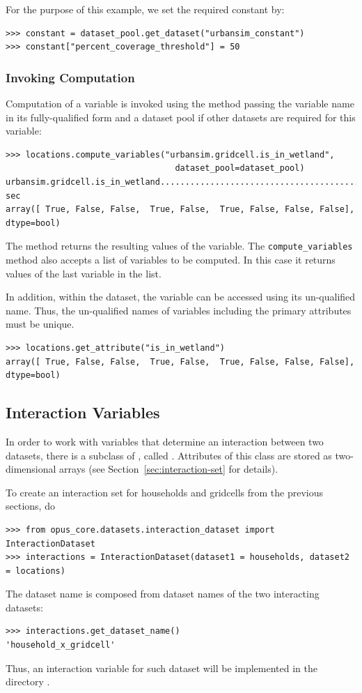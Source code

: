 For the purpose of this example, we set the required constant by:
\begin{verbatim}
>>> constant = dataset_pool.get_dataset("urbansim_constant")
>>> constant["percent_coverage_threshold"] = 50
\end{verbatim}

\subsubsection{Invoking Computation}
\label{sec:compute-variables}
Computation of a variable is invoked using the  method
 passing the variable name in its fully-qualified
form and a dataset pool if other datasets are required for this variable:
 \label{page:compute-isnearcbd}

\begin{verbatim}
>>> locations.compute_variables("urbansim.gridcell.is_in_wetland",
                                  dataset_pool=dataset_pool)
urbansim.gridcell.is_in_wetland..........................................0.0 sec
array([ True, False, False,  True, False,  True, False, False, False], dtype=bool)
\end{verbatim}

The method returns the resulting values of the variable. The
\verb|compute_variables| method also accepts a list of variables to be
computed.  In this case it returns values of the last variable in the list.

 In addition, within the dataset, the variable can be accessed using its un-qualified name.
 Thus, the un-qualified names of variables including the primary
 attributes must be unique.
\begin{verbatim}
>>> locations.get_attribute("is_in_wetland")
array([ True, False, False,  True, False,  True, False, False, False], dtype=bool)
\end{verbatim}

\subsection{Interaction Variables}
\label{sec:interactions}

In order to work with variables that determine an
interaction between two datasets, there is a subclass of
, called
. Attributes of this class are stored as
two-dimensional arrays (see Section~\ref{sec:interaction-set} for details).

To create an interaction set for households and gridcells from the previous
sections, do
\begin{verbatim}
>>> from opus_core.datasets.interaction_dataset import InteractionDataset
>>> interactions = InteractionDataset(dataset1 = households, dataset2 = locations)
\end{verbatim}
The dataset name is composed from dataset names of the two interacting datasets: 
\begin{verbatim}
>>> interactions.get_dataset_name()
'household_x_gridcell'
\end{verbatim}
Thus, an interaction variable for such dataset will be implemented in the
directory .

